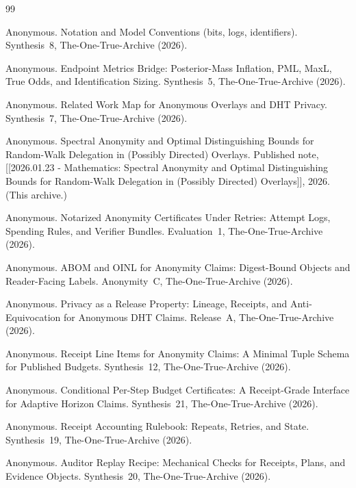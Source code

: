 \documentclass[11pt]{article}
\begin{document}
\begin{thebibliography}{99}\small

Anonymous.
\newblock Notation and Model Conventions (bits, logs, identifiers).
\newblock Synthesis~8, The-One-True-Archive (2026).


Anonymous.
\newblock Endpoint Metrics Bridge: Posterior-Mass Inflation, PML, MaxL, True Odds, and Identification Sizing.
\newblock Synthesis~5, The-One-True-Archive (2026).

Anonymous.
\newblock Related Work Map for Anonymous Overlays and DHT Privacy.
\newblock Synthesis~7, The-One-True-Archive (2026).

Anonymous.
\newblock Spectral Anonymity and Optimal Distinguishing Bounds for Random-Walk Delegation in (Possibly Directed) Overlays.
\newblock Published note, [[2026.01.23 - Mathematics: Spectral Anonymity and Optimal Distinguishing Bounds for Random-Walk Delegation in (Possibly Directed) Overlays]], 2026. (This archive.)

Anonymous.
\newblock Notarized Anonymity Certificates Under Retries: Attempt Logs, Spending Rules, and Verifier Bundles.
\newblock Evaluation~1, The-One-True-Archive (2026).

Anonymous.
\newblock ABOM and OINL for Anonymity Claims: Digest-Bound Objects and Reader-Facing Labels.
\newblock Anonymity~C, The-One-True-Archive (2026).

Anonymous.
\newblock Privacy as a Release Property: Lineage, Receipts, and Anti-Equivocation for Anonymous DHT Claims.
\newblock Release~A, The-One-True-Archive (2026).

Anonymous.
\newblock Receipt Line Items for Anonymity Claims: A Minimal Tuple Schema for Published Budgets.
\newblock Synthesis~12, The-One-True-Archive (2026).

Anonymous.
\newblock Conditional Per-Step Budget Certificates: A Receipt-Grade Interface for Adaptive Horizon Claims.
\newblock Synthesis~21, The-One-True-Archive (2026).

Anonymous.
\newblock Receipt Accounting Rulebook: Repeats, Retries, and State.
\newblock Synthesis~19, The-One-True-Archive (2026).

Anonymous.
\newblock Auditor Replay Recipe: Mechanical Checks for Receipts, Plans, and Evidence Objects.
\newblock Synthesis~20, The-One-True-Archive (2026).



\end{thebibliography}
\end{document}
